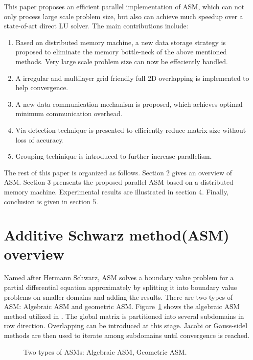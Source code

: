 \documentclass{sig-alternate}
\begin{document}
	This paper proposes an efficient parallel implementation of ASM, which can not only process large scale problem size, 
	but also can achieve much speedup over a state-of-art direct LU solver. The main contributions include:
	\begin{enumerate}[1)]
	\item Based on distributed memory machine, a new data storage strategy is proposed to eliminate the memory bottle-neck of
	the above mentioned methods. Very large scale problem size can now be effeciently handled.
	\item A irregular and multilayer grid friendly full 2D overlapping is implemented to help convergence. 
	\item A new data communication mechanism is proposed, which achieves optimal minimum communication overhead.
	\item Via detection technique is presented to efficiently reduce matrix size without loss of accuracy.
	\item Grouping techinique is introduced to further increase parallelism.
	\end{enumerate}

	The rest of this paper is organized as follows. Section 2 gives an overview of ASM. Section 3 prensents 
	the proposed parallel ASM based on a distributed memory machine. Experimental results are illustrated in section 4. 
	Finally, conclusion is given in section 5.

\section{Additive Schwarz method(ASM) overview}	
	Named after Hermann Schwarz, ASM solves a boundary value problem for a partial 
	differential equation approximately by splitting it into boundary value problems on smaller domains and adding the results.
	There are two types of ASM: Algebraic ASM and geometric ASM. 
	Figure~\ref{Fig2} shows the algebraic ASM method utilized in \cite{kaisun}. The global matrix
	is partitioned into several subdomains in row direction. 
	Overlapping can be introduced at this stage. Jacobi or Gauss-sidel methods are then used to iterate among subdomains until 
	convergence is reached.\\	
	\begin{figure}[htbp]
	  \caption{Two types of ASMs: 
	   Algebraic ASM,
	   Geometric ASM.}
	  \label{Fig2}
	\end{figure}
\end{document}
